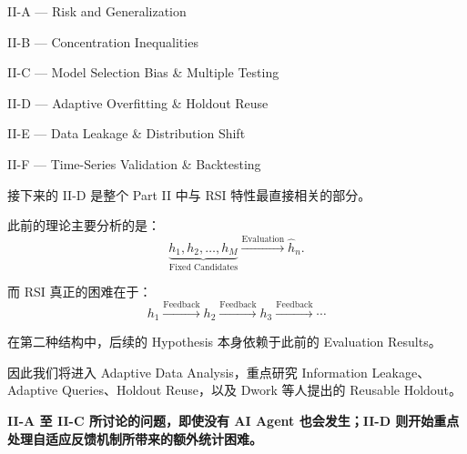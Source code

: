II-A --- Risk and Generalization

II-B --- Concentration Inequalities

II-C --- Model Selection Bias \& Multiple Testing

II-D --- Adaptive Overfitting \& Holdout Reuse

II-E --- Data Leakage \& Distribution Shift

II-F --- Time-Series Validation \& Backtesting

接下来的 II-D 是整个 Part II 中与 RSI 特性最直接相关的部分。

此前的理论主要分析的是：
\[\underbrace{
h_1,h_2,\ldots,h_M
}_{\text{Fixed Candidates}}
\xrightarrow{\text{Evaluation}}
\hat h_n.\]

而 RSI 真正的困难在于：
\[h_1
\xrightarrow{\text{Feedback}}
h_2
\xrightarrow{\text{Feedback}}
h_3
\xrightarrow{\text{Feedback}}
\cdots\]

在第二种结构中，后续的 Hypothesis 本身依赖于此前的 Evaluation Results。

因此我们将进入 Adaptive Data Analysis，重点研究 Information Leakage、Adaptive Queries、Holdout Reuse，以及 Dwork 等人提出的 Reusable Holdout。

\textbf{II-A 至 II-C 所讨论的问题，即使没有 AI Agent 也会发生；II-D 则开始重点处理自适应反馈机制所带来的额外统计困难。}
